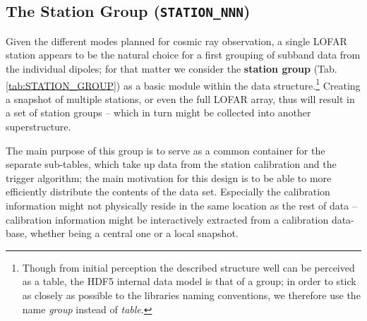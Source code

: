 \documentclass[a4paper,10pt,bibtotoc]{scrartcl}
\begin{document}




\subsection{The Station Group ({\tt STATION\_NNN})}
\label{sec:station group}

Given the different modes planned for cosmic ray observation, a single LOFAR 
station appears to be the natural choice for a first grouping of subband
data from the individual dipoles; for that matter we consider the
\textbf{station group} (Tab. \ref{tab:STATION_GROUP}) as a basic module within
the data structure.\footnote{Though from initial perception the described 
structure well can be perceived as a table, the HDF5 internal data model is that
of a group; in order to stick as closely as possible to the libraries naming
conventions, we therefore use the name \textsl{group} instead of \textsl{table}.}
Creating a snapshot of multiple stations, or even the full LOFAR array, thus will
result in a set of station groups -- which in turn might be collected into
another superstructure.

The main purpose of this group is to serve as a common container for the separate
sub-tables, which take up data from the station calibration and the trigger
algorithm; the main motivation for this design is to be able to more efficiently
distribute the contents of the data set. Especially the calibration information
might not physically reside in the same location as the rest of data --
calibration information might be interactively extracted from a calibration
data-base, whether being a central one or a local snapshot.
\end{document}
